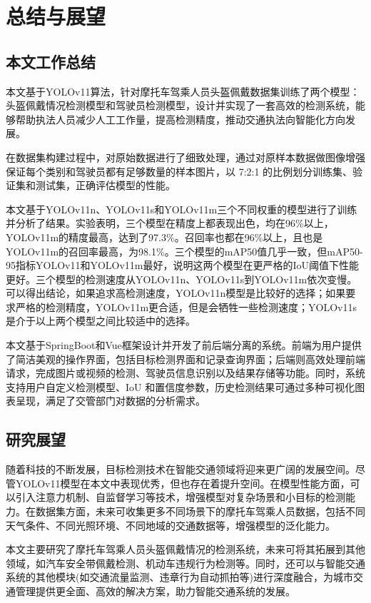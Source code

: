 
\chapter{总结与展望}

\section{本文工作总结}
本文基于YOLOv11算法，针对摩托车驾乘人员头盔佩戴数据集训练了两个模型：头盔佩戴情况检测模型和驾驶员检测模型，设计并实现了一套高效的检测系统，能够帮助执法人员减少人工工作量，提高检测精度，推动交通执法向智能化方向发展。

在数据集构建过程中，对原始数据进行了细致处理，通过对原样本数据做图像增强保证每个类别和驾驶员都有足够数量的样本图片，以 7:2:1 的比例划分训练集、验证集和测试集，正确评估模型的性能。

本文基于YOLOv11n、YOLOv11s和YOLOv11m三个不同权重的模型进行了训练并分析了结果。实验表明，三个模型在精度上都表现出色，均在96\%以上，YOLOv11m的精度最高，达到了97.3\%。召回率也都在96\%以上，且也是YOLOv11m的召回率最高，为98.1\%。三个模型的mAP50值几乎一致，但mAP50-95指标YOLOv11和YOLOv11m最好，说明这两个模型在更严格的IoU阈值下性能更好。三个模型的检测速度从YOLOv11n、YOLOv11s到YOLOv11m依次变慢。可以得出结论，如果追求高检测速度，YOLOv11n模型是比较好的选择；如果要求严格的检测精度，YOLOv11m更合适，但是会牺牲一些检测速度；YOLOv11s是介于以上两个模型之间比较适中的选择。


本文基于SpringBoot和Vue框架设计并开发了前后端分离的系统。前端为用户提供了简洁美观的操作界面，包括目标检测界面和记录查询界面；后端则高效处理前端请求，完成图片或视频的检测、驾驶员信息识别以及结果存储等功能。同时，系统支持用户自定义检测模型、IoU 和置信度参数，历史检测结果可通过多种可视化图表呈现，满足了交管部门对数据的分析需求。

\section{研究展望}
随着科技的不断发展，目标检测技术在智能交通领域将迎来更广阔的发展空间。尽管YOLOv11模型在本文中表现优秀，但也存在着提升空间。在模型性能方面，可以引入注意力机制、自监督学习等技术，增强模型对复杂场景和小目标的检测能力。在数据集方面，未来可收集更多不同场景下的摩托车驾乘人员数据，包括不同天气条件、不同光照环境、不同地域的交通数据等，增强模型的泛化能力。

本文主要研究了摩托车驾乘人员头盔佩戴情况的检测系统，未来可将其拓展到其他领域，如汽车安全带佩戴检测、机动车违规行为检测等。同时，还可以与智能交通系统的其他模块(如交通流量监测、违章行为自动抓拍等)进行深度融合，为城市交通管理提供更全面、高效的解决方案，助力智能交通系统的发展。

